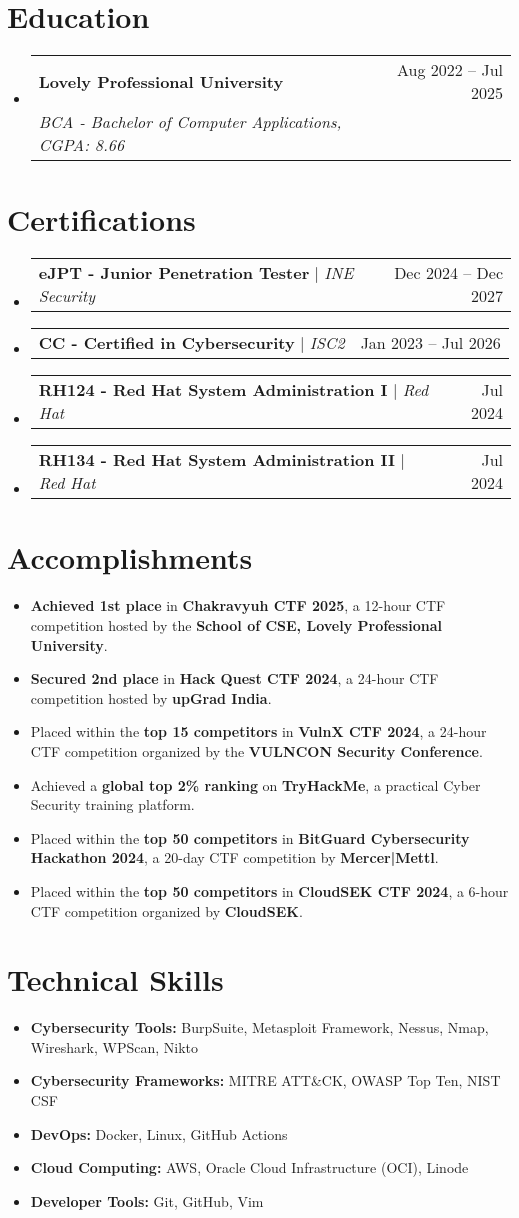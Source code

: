 \documentclass[letterpaper,12pt]{article}
\newcommand{\resumeItem}[1]{
  \item[--]\small{#1} %
}
\newcommand{\resumeSubheading}[4]{
  \item \vspace{1pt}
    \begin{tabularx}{\textwidth}{Xr}
      \textbf{#1} & #2 \\
      \textit{\small#3} & \textit{\small #4} \\
    \end{tabularx} \vspace{1pt}
}
\newcommand{\resumeCertHeading}[2]{
    \item
    \begin{tabularx}{\textwidth}{Xr}
      \small#1 & #2 \\
    \end{tabularx}
}
\newcommand{\resumeItemListStart}{\begin{itemize}[topsep=1pt, itemsep=1pt, leftmargin=0.2in]}
\newcommand{\resumeItemListEnd}{\end{itemize} \vspace{1pt}}
\newcommand{\resumeSubHeadingListStart}{\begin{itemize}[leftmargin=0.15in, label={}, topsep=2pt]}
\newcommand{\resumeSubHeadingListEnd}{\end{itemize}}
\begin{document}

\section{Education}
  \resumeSubHeadingListStart
    \resumeSubheading
      {Lovely Professional University}{Aug 2022 -- Jul 2025}
      {BCA - Bachelor of Computer Applications, CGPA: 8.66}{}
  \resumeSubHeadingListEnd


\section{Certifications}
  \resumeSubHeadingListStart
    \resumeCertHeading
      {\textbf{eJPT - Junior Penetration Tester} $|$ \emph{INE Security}}{Dec 2024 -- Dec 2027}
    \resumeCertHeading
      {\textbf{CC - Certified in Cybersecurity} $|$ \emph{ISC2}}{Jan 2023 -- Jul 2026}
    \resumeCertHeading
      {\textbf{RH124 - Red Hat System Administration I} $|$ \emph{Red Hat}}{Jul 2024}
    \resumeCertHeading
      {\textbf{RH134 - Red Hat System Administration II} $|$ \emph{Red Hat}}{Jul 2024}
  \resumeSubHeadingListEnd


\section{Accomplishments}
\resumeItemListStart
    \resumeItem{\textbf{Achieved 1st place} in \textbf{Chakravyuh CTF 2025}, a 12-hour CTF competition hosted by the \textbf{School of CSE, Lovely Professional University}.}
    \resumeItem{\textbf{Secured 2nd place} in \textbf{Hack Quest CTF 2024}, a 24-hour CTF competition hosted by \textbf{upGrad India}.}
    \resumeItem{Placed within the \textbf{top 15 competitors} in \textbf{VulnX CTF 2024}, a 24-hour CTF competition organized by the \textbf{VULNCON Security Conference}.}
    \resumeItem{Achieved a \textbf{global top 2\% ranking} on \textbf{TryHackMe}, a practical Cyber Security training platform.}
    \resumeItem{Placed within the \textbf{top 50 competitors} in \textbf{BitGuard Cybersecurity Hackathon 2024}, a 20-day CTF competition by \textbf{Mercer|Mettl}.}
    \resumeItem{Placed within the \textbf{top 50 competitors} in \textbf{CloudSEK CTF 2024}, a 6-hour CTF competition organized by \textbf{CloudSEK}.}
\resumeItemListEnd


\section{Technical Skills}
  \resumeItemListStart
    \resumeItem{\textbf{Cybersecurity Tools:} BurpSuite, Metasploit Framework, Nessus, Nmap, Wireshark, WPScan, Nikto}
    \resumeItem{\textbf{Cybersecurity Frameworks:} MITRE ATT\&CK, OWASP Top Ten, NIST CSF}
    \resumeItem{\textbf{DevOps:} Docker, Linux, GitHub Actions}
    \resumeItem{\textbf{Cloud Computing:} AWS, Oracle Cloud Infrastructure (OCI), Linode}
    \resumeItem{\textbf{Developer Tools:} Git, GitHub, Vim}
  \resumeItemListEnd
\end{document}
